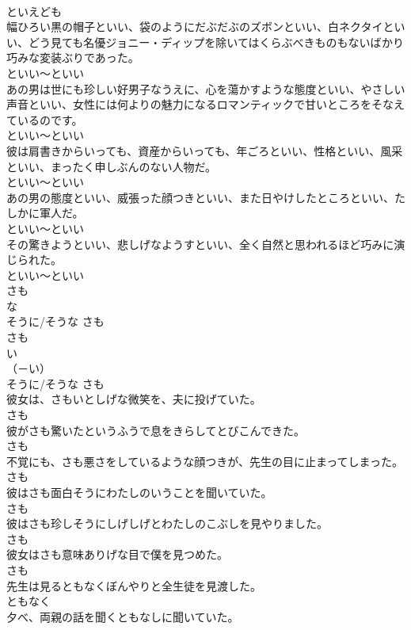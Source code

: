 \documentclass[8pt]{extreport}
\begin{document}
\begin{CJK}{UTF8}{min}
\\	といえども
\\	幅ひろい黒の帽子といい、袋のようにだぶだぶのズボンといい、白ネクタイといい、どう見ても名優ジョニー・ディップを除いてはくらぶべきものもないばかり巧みな変装ぶりであった。	
\\	といい～といい
\\	あの男は世にも珍しい好男子なうえに、心を蕩かすような態度といい、やさしい声音といい、女性には何よりの魅力になるロマンティックで甘いところをそなえているのです。	
\\	といい～といい
\\	彼は肩書きからいっても、資産からいっても、年ごろといい、性格といい、風采といい、まったく申しぶんのない人物だ。	
\\	といい～といい
\\	あの男の態度といい、威張った顔つきといい、また日やけしたところといい、たしかに軍人だ。	
\\	といい～といい
\\	その驚きようといい、悲しげなようすといい、全く自然と思われるほど巧みに演じられた。	
\\	といい～といい
\\	さも 
\\	な
\\	そうに/そうな	さも 
\\	さも 
\\	い
\\	（－い） 
\\	そうに/そうな	さも
\\	彼女は、さもいとしげな微笑を、夫に投げていた。	
\\	さも
\\	彼がさも驚いたというふうで息をきらしてとびこんできた。	
\\	さも
\\	不覚にも、さも悪さをしているような顔つきが、先生の目に止まってしまった。	
\\	さも
\\	彼はさも面白そうにわたしのいうことを聞いていた。	
\\	さも
\\	彼はさも珍しそうにしげしげとわたしのこぶしを見やりました。	
\\	さも
\\	彼女はさも意味ありげな目で僕を見つめた。	
\\	さも
\\	先生は見るともなくぼんやりと全生徒を見渡した。	
\\	ともなく
\\	夕べ、両親の話を聞くともなしに聞いていた。	

\end{CJK}
\end{document}
